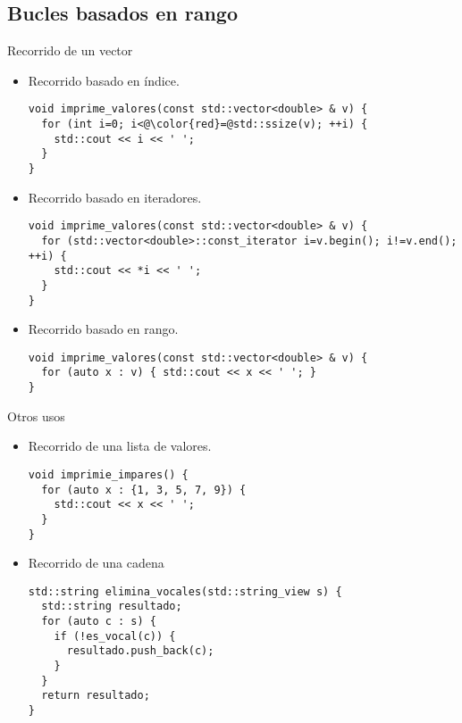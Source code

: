 \subsection{Bucles basados en rango}

\begin{frame}[t,fragile]{Recorrido de un vector}
\vspace{-1em}
\begin{itemize}
\item Recorrido basado en índice.
\begin{lstlisting}[escapechar=@]
void imprime_valores(const std::vector<double> & v) {
  for (int i=0; i<@\color{red}=@std::ssize(v); ++i) {
    std::cout << i << ' ';
  }
}
\end{lstlisting}

\vfill\pause
\item Recorrido basado en iteradores.
\begin{lstlisting}
void imprime_valores(const std::vector<double> & v) {
  for (std::vector<double>::const_iterator i=v.begin(); i!=v.end(); ++i) {
    std::cout << *i << ' ';
  }
}
\end{lstlisting}
\vfill\pause
\item Recorrido basado en rango.
\begin{lstlisting}
void imprime_valores(const std::vector<double> & v) {
  for (auto x : v) { std::cout << x << ' '; }
}
\end{lstlisting}
\end{itemize}
\end{frame}

\begin{frame}[t,fragile]{Otros usos}
\begin{itemize}
  \item Recorrido de una lista de valores.
\begin{lstlisting}
void imprimie_impares() {
  for (auto x : {1, 3, 5, 7, 9}) {
    std::cout << x << ' ';
  }
}
\end{lstlisting}

  \vfill\pause
  \item Recorrido de una cadena
\begin{lstlisting}
std::string elimina_vocales(std::string_view s) {
  std::string resultado;
  for (auto c : s) { 
    if (!es_vocal(c)) {
      resultado.push_back(c);
    }
  }
  return resultado;
}
\end{lstlisting}
\end{itemize}
\end{frame}
